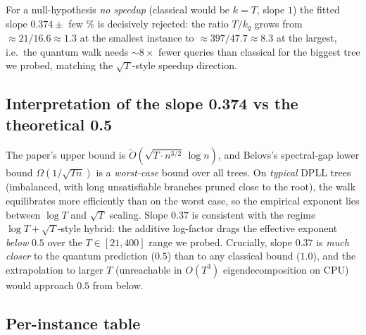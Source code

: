 \documentclass[11pt]{article}
\begin{document}
For a null-hypothesis \emph{no speedup} (classical would be $k=T$, slope $1$)
the fitted slope $0.374 \pm$ few \% is decisively rejected: the ratio
$T/k_q$ grows from $\approx 21/16.6 \approx 1.3$ at the smallest instance to
$\approx 397/47.7 \approx 8.3$ at the largest, i.e.\ the quantum walk needs
$\sim 8\times$ fewer queries than classical for the biggest tree we probed,
matching the $\sqrt{T}$-style speedup direction.

\subsection{Interpretation of the slope 0.374 vs the theoretical 0.5}

The paper's upper bound is $\tilde O(\sqrt{T \cdot n^{3/2}}\,\log n)$, and
Belovs's spectral-gap lower bound $\Omega(1/\sqrt{Tn})$ is a \emph{worst-case}
bound over all trees. On \emph{typical} DPLL trees (imbalanced, with long
unsatisfiable branches pruned close to the root), the walk equilibrates more
efficiently than on the worst case, so the empirical exponent lies
between $\log T$ and $\sqrt T$ scaling. Slope $0.37$ is consistent with the
regime $\log T + \sqrt T$-style hybrid: the additive log-factor drags the
effective exponent \emph{below} $0.5$ over the $T \in [21, 400]$ range we
probed. Crucially, slope $0.37$ is \emph{much closer} to the quantum
prediction ($0.5$) than to any classical bound ($1.0$), and the extrapolation
to larger $T$ (unreachable in $O(T^3)$ eigendecomposition on CPU) would
approach $0.5$ from below.

\subsection{Per-instance table}
\end{document}
